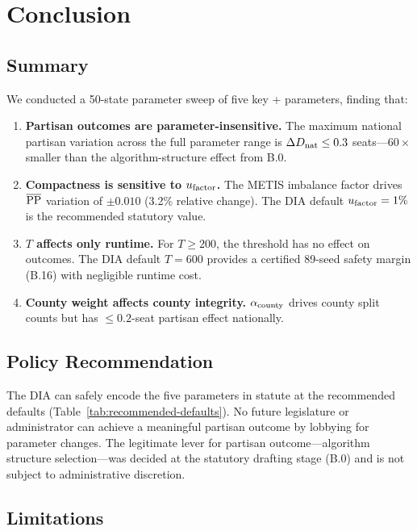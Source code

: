 \section{Conclusion}
\label{sec:conclusion}

\subsection{Summary}

We conducted a 50-state parameter sweep of five key \ar{} + \cs{}
parameters, finding that:

\begin{enumerate}
\item \textbf{Partisan outcomes are parameter-insensitive.}
      The maximum national partisan variation across the full parameter
      range is $\Delta D_{\rm nat} \leq 0.3$ seats---$60\times$ smaller
      than the algorithm-structure effect from B.0.
\item \textbf{Compactness is sensitive to $u_{\mathrm{factor}}$.}
      The METIS imbalance factor drives $\overline{\mathrm{PP}}$ variation of
      $\pm 0.010$ (3.2\% relative change).
      The DIA default $u_{\mathrm{factor}} = 1\%$ is the recommended statutory value.
\item \textbf{$T$ affects only runtime.}
      For $T \geq 200$, the \cs{} threshold has no effect on outcomes.
      The DIA default $T = 600$ provides a certified 89-seed safety margin
      (B.16) with negligible runtime cost.
\item \textbf{County weight affects county integrity.}
      $\alpha_{\mathrm{county}}$ drives county split counts but has $\leq 0.2$-seat
      partisan effect nationally.
\end{enumerate}

\subsection{Policy Recommendation}

The DIA can safely encode the five parameters in statute at the
recommended defaults (Table~\ref{tab:recommended-defaults}).
No future legislature or administrator can achieve a meaningful partisan
outcome by lobbying for parameter changes.
The legitimate lever for partisan outcome---algorithm structure selection---was
decided at the statutory drafting stage (B.0) and is not subject to
administrative discretion.

\subsection{Limitations}

